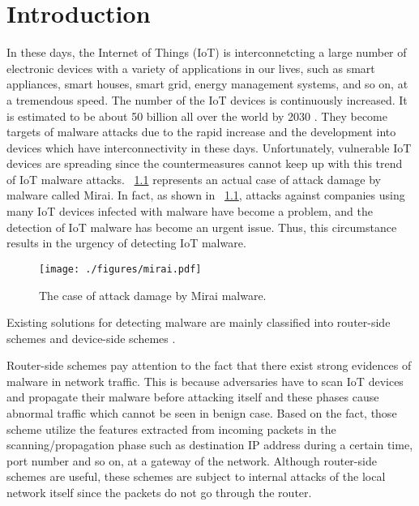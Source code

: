 \chapter{Introduction}\label{Sec:Introduction}

In these days, the Internet of Things (IoT) is interconnetcting a large number of electronic devices with a variety of applications in our lives, such as smart appliances, smart houses, smart grid, energy management systems, and so on, at a tremendous speed.
The number of the IoT devices is continuously increased.
It is estimated to be about 50 billion all over the world by 2030 \cite{bg1, bg2}.
They become targets of malware attacks due to the rapid increase and the development into devices which have interconnectivity in these days.
Unfortunately, vulnerable IoT devices are spreading since the countermeasures cannot keep up with this trend of IoT malware attacks.
\figurename~\ref{fig:mirai} represents an actual case of attack damage by malware called Mirai.
In fact, as shown in \figurename~\ref{fig:mirai}, attacks against companies using many IoT devices infected with malware have become a problem, and the detection of IoT malware has become an urgent issue.
Thus, this circumstance results in the urgency of detecting IoT malware.

\begin{figure}[t]
 \centering
 \texttt{[image: ./figures/mirai.pdf]}
 \caption{The case of attack damage by Mirai malware.} 
 \label{fig:mirai}
\end{figure}
Existing solutions for detecting malware are mainly classified into router-side schemes \cite{net} and device-side schemes \cite{om, cfg}.

Router-side schemes pay attention to the fact that there exist strong evidences of malware in network traffic.
This is because adversaries have to scan IoT devices and propagate their malware before attacking itself and these phases cause abnormal traffic which cannot be seen in benign case.
Based on the fact, those scheme utilize the features extracted from incoming packets in the scanning/propagation phase such as destination IP address during a certain time, port number and so on, at a gateway of the network.
Although router-side schemes are useful, these schemes are subject to internal attacks of the local network itself since the packets do not go through the router.

